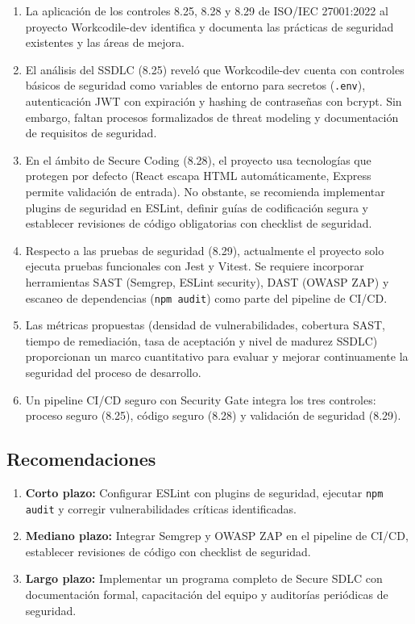 \begin{enumerate}
    \item La aplicación de los controles 8.25, 8.28 y 8.29 de ISO/IEC 27001:2022 al proyecto Workcodile-dev identifica y documenta las prácticas de seguridad existentes y las áreas de mejora.

    \item El análisis del SSDLC (8.25) reveló que Workcodile-dev cuenta con controles básicos de seguridad como variables de entorno para secretos (\texttt{.env}), autenticación JWT con expiración y hashing de contraseñas con bcrypt. Sin embargo, faltan procesos formalizados de threat modeling y documentación de requisitos de seguridad.

    \item En el ámbito de Secure Coding (8.28), el proyecto usa tecnologías que protegen por defecto (React escapa HTML automáticamente, Express permite validación de entrada). No obstante, se recomienda implementar plugins de seguridad en ESLint, definir guías de codificación segura y establecer revisiones de código obligatorias con checklist de seguridad.

    \item Respecto a las pruebas de seguridad (8.29), actualmente el proyecto solo ejecuta pruebas funcionales con Jest y Vitest. Se requiere incorporar herramientas SAST (Semgrep, ESLint security), DAST (OWASP ZAP) y escaneo de dependencias (\texttt{npm audit}) como parte del pipeline de CI/CD.

    \item Las métricas propuestas (densidad de vulnerabilidades, cobertura SAST, tiempo de remediación, tasa de aceptación y nivel de madurez SSDLC) proporcionan un marco cuantitativo para evaluar y mejorar continuamente la seguridad del proceso de desarrollo.

    \item Un pipeline CI/CD seguro con Security Gate integra los tres controles: proceso seguro (8.25), código seguro (8.28) y validación de seguridad (8.29).
\end{enumerate}

\subsection{Recomendaciones}

\begin{enumerate}
    \item \textbf{Corto plazo:} Configurar ESLint con plugins de seguridad, ejecutar \texttt{npm audit} y corregir vulnerabilidades críticas identificadas.

    \item \textbf{Mediano plazo:} Integrar Semgrep y OWASP ZAP en el pipeline de CI/CD, establecer revisiones de código con checklist de seguridad.

    \item \textbf{Largo plazo:} Implementar un programa completo de Secure SDLC con documentación formal, capacitación del equipo y auditorías periódicas de seguridad.
\end{enumerate}

